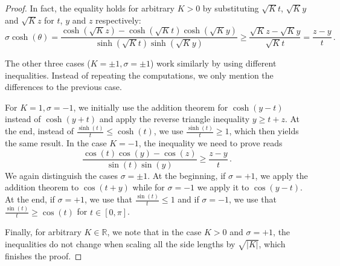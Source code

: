 \documentclass[10pt,a4paper]{amsart}
\newcommand{\R}{\mathbb R}
\begin{document}
\begin{proof}
    In fact, the equality holds for arbitrary $K>0$ by substituting $\sqrt{K}t$, $\sqrt{K}y$ and $\sqrt{K}z$ for $t$, $y$ and $z$ respectively:
    \[ \sigma \cosh(\theta) =\frac{\cosh(\sqrt{K}z) - \cosh(\sqrt{K} t)\cosh(\sqrt{K} y)}{\sinh(\sqrt{K} t) \sinh(\sqrt{K} y)} \geq \frac{\sqrt{K} z - \sqrt{K} y}{\sqrt{K} t} = \frac{z-y}{t} \, .\]

    The other three cases ($K=\pm1, \sigma=\pm1$) work similarly by using different inequalities.
    Instead of repeating the computations, we only mention the differences to the previous case. 
    
    For $K=1,\sigma=-1$, we initially use the addition theorem for $\cosh(y-t)$ instead of $\cosh(y+t)$ and apply the reverse triangle inequality $y\geq t+z$. At the end, instead of $\frac{\sinh(t)}{t}\leq\cosh(t)$, we use $\frac{\sinh(t)}{t}\geq 1$, which then yields the same result. 
    In the case $K=-1$, the inequality we need to prove reads 
    \[\frac{\cos(t)\cos(y) - \cos(z)}{\sin(t) \sin(y)} \geq \frac{z-y}{t} \, .\]
    We again distinguish the cases $\sigma=\pm1$. At the beginning, if $\sigma=+1$, we apply the addition theorem to $\cos(t+y)$ while for $\sigma=-1$ we apply it to $\cos(y-t)$. At the end, if $\sigma=+1$, we use that $\frac{\sin(t)}{t}\leq 1$ and if $\sigma=-1$, we use that $\frac{\sin(t)}{t}\geq \cos(t)$ for $t\in[0,\pi]$.  

    Finally, for arbitrary $K\in\R$, we note that in the case $K>0$ and $\sigma=+1$, the inequalities do not change when scaling all the side lengths by $\sqrt{|K|}$, which finishes the proof.
\end{proof}
\end{document}

